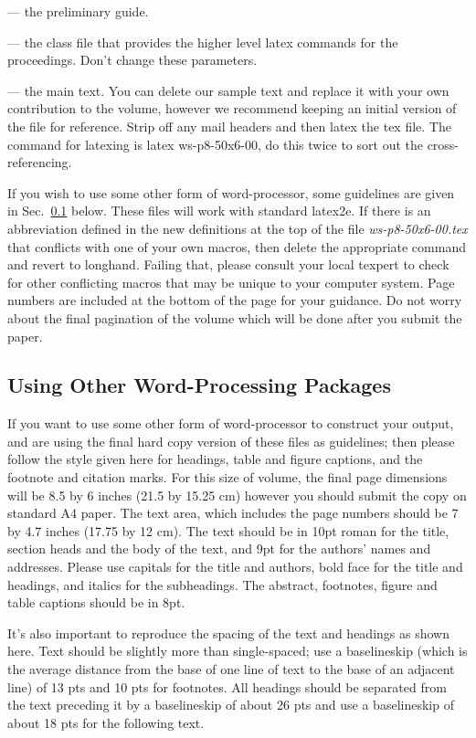 \documentclass{ws-p8-50x6-00}
\begin{document}
 --- the preliminary guide.

 --- the class file that provides the higher
level latex commands for the proceedings. Don't change these parameters.

 --- the main text. You can delete our
sample text and replace it with your own contribution to the
volume, however we recommend keeping an initial version of the
file for reference.  Strip off any mail headers and then latex
the tex file.  The command for latexing is {\sf latex ws-p8-50x6-00},
do this twice to sort out the cross-referencing.

If you wish to use some other form of word-processor, some
guidelines are given in Sec.~\ref{subsec:wpp} below.  These
files will work with standard latex2e. If there is an
abbreviation defined in the new definitions at the top of the
file {\em  ws-p8-50x6-00.tex} that conflicts with one of your own
macros, then delete the appropriate command and revert to
longhand. Failing that, please consult your local texpert to
check for other conflicting macros that may be unique to your
computer system.  Page numbers are included at the bottom of the
page for your guidance. Do not worry about the final pagination
of the volume which will be done after you submit the paper.

\subsection{Using Other Word-Processing Packages}\label{subsec:wpp}
If you want to use some other form of word-processor to
construct your output, and are using the final hard copy version
of these files as guidelines; then please follow the style given
here for headings, table and figure captions, and the footnote
and citation marks.  For this size of volume, the final page
dimensions will be 8.5 by 6 inches (21.5 by 15.25 cm) however
you should submit the copy on standard A4 paper. The text area,
which includes the page numbers should be 7 by 4.7 inches (17.75
by 12 cm).  The text should be in 10pt roman for the title,
section heads and the body of the text, and 9pt for the authors'
names and addresses.  Please use capitals for the title and
authors, bold face for the title and headings, and italics for
the subheadings.  The abstract, footnotes, figure and table
captions should be in 8pt.

It's also important to reproduce the spacing of the text and
headings as shown here. Text should be slightly more than
single-spaced; use a baselineskip (which is the average distance
from the base of one line of text to the base of an adjacent
line) of 13 pts and 10 pts for footnotes.  All headings should
be separated from the text preceding it by a baselineskip of
about 26 pts and use a baselineskip of about 18 pts for the
following text.
\end{document}
